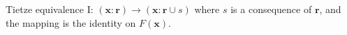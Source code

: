 Tietze equivalence I: $(\mathbf{x} : \mathbf{r}) \to (\mathbf{x} : \mathbf{r} \cup s)$ where $s$ is a consequence of $\mathbf{r}$, and the mapping is the identity on $F(\mathbf{x})$.
